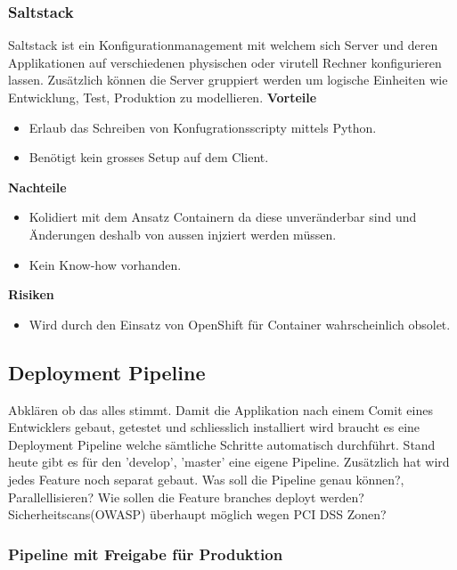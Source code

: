 \subsubsection{Saltstack}

Saltstack ist ein Konfigurationmanagement mit welchem sich Server und deren Applikationen auf verschiedenen physischen oder virutell Rechner konfigurieren lassen. Zusätzlich können die Server gruppiert werden um logische Einheiten wie Entwicklung, Test, Produktion zu modellieren.\newline
\newline
\textbf{Vorteile}
\begin{itemize}
	\item Erlaub das Schreiben von Konfugrationsscripty mittels Python.
	\item Benötigt kein grosses Setup auf dem Client.
\end{itemize}
\textbf{Nachteile}
\begin{itemize}
	\item Kolidiert mit dem Ansatz Containern da diese unveränderbar sind und Änderungen deshalb von aussen injziert werden müssen.
	\item Kein Know-how vorhanden.
\end{itemize}
\textbf{Risiken}
\begin{itemize}
	\item Wird durch den Einsatz von OpenShift für Container wahrscheinlich obsolet.
\end{itemize}

\subsection{Deployment Pipeline}

Abklären ob das alles stimmt.
Damit die Applikation nach einem Comit eines Entwicklers gebaut, getestet und schliesslich installiert wird braucht es eine Deployment Pipeline welche sämtliche Schritte automatisch durchführt. Stand heute gibt es für den 'develop', 'master' eine eigene Pipeline. Zusätzlich hat wird jedes Feature noch separat gebaut. 
Was soll die Pipeline genau können?, Parallellisieren? Wie sollen die Feature branches deployt werden? Sicherheitscans(OWASP) überhaupt möglich wegen PCI DSS Zonen?

\subsubsection{Pipeline mit Freigabe für Produktion}


